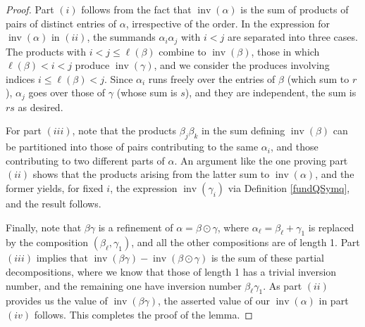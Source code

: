 \documentclass{article}
\theoremstyle{definition}
\begin{document}
\begin{proof}
Part $(i)$ follows from the fact that $\operatorname{inv}(\alpha)$ is the sum of products of pairs of distinct entries of $\alpha$, irrespective of the order. In the expression for $\operatorname{inv}(\alpha)$ in $(ii)$, the summands $\alpha_{i}\alpha_{j}$ with $i<j$ are separated into three cases. The products with $i<j\leq\ell(\beta)$ combine to $\operatorname{inv}(\beta)$, those in which $\ell(\beta)<i<j$ produce $\operatorname{inv}(\gamma)$, and we consider the produces involving indices $i\leq\ell(\beta)<j$. Since $\alpha_{i}$ runs freely over the entries of $\beta$ (which sum to $r$), $\alpha_{j}$ goes over those of $\gamma$ (whose sum is $s$), and they are independent, the sum is $rs$ as desired.

For part $(iii)$, note that the products $\beta_{j}\beta_{k}$ in the sum defining $\operatorname{inv}(\beta)$ can be partitioned into those of pairs contributing to the same $\alpha_{i}$, and those contributing to two different parts of $\alpha$. An argument like the one proving part $(ii)$ shows that the products arising from the latter sum to $\operatorname{inv}(\alpha)$, and the former yields, for fixed $i$, the expression $\operatorname{inv}(\gamma_{i})$ via Definition \ref{fundQSymq}, and the result follows.

Finally, note that $\beta\gamma$ is a refinement of $\alpha=\beta\odot\gamma$, where $\alpha_{\ell}=\beta_{\ell}+\gamma_{1}$ is replaced by the composition $(\beta_{\ell},\gamma_{1})$, and all the other compositions are of length 1. Part $(iii)$ implies that $\operatorname{inv}(\beta\gamma)-\operatorname{inv}(\beta\odot\gamma)$ is the sum of these partial decompositions, where we know that those of length 1 has a trivial inversion number, and the remaining one have inversion number $\beta_{\ell}\gamma_{1}$. As part $(ii)$ provides us the value of $\operatorname{inv}(\beta\gamma)$, the asserted value of our $\operatorname{inv}(\alpha)$ in part $(iv)$ follows. This completes the proof of the lemma.
\end{proof}
\end{document}
